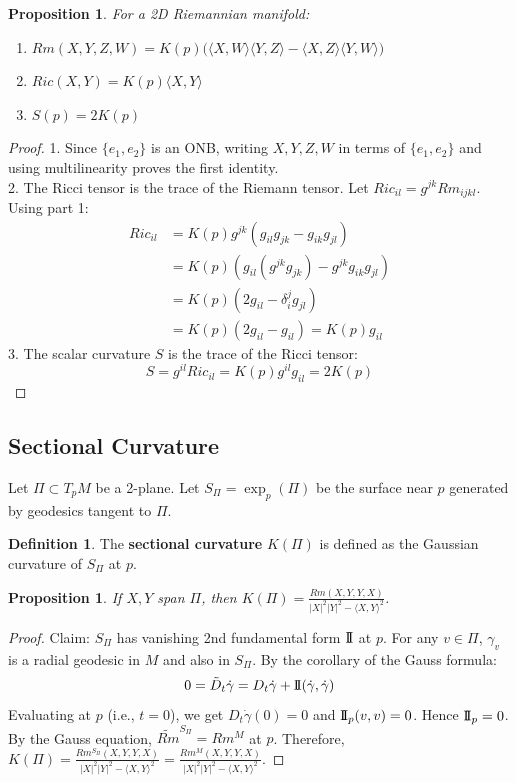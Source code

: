 \documentclass[11pt, a4paper]{article}
\theoremstyle{plain}
\newtheorem{proposition}[theorem]{Proposition}
\theoremstyle{definition}
\newtheorem{definition}[theorem]{Definition}
\theoremstyle{remark}
\begin{document}
{\begin{proposition}
For a 2D Riemannian manifold:
\begin{enumerate}
    \item $Rm(X,Y,Z,W) = K(p) \big( \langle X,W \rangle \langle Y,Z \rangle - \langle X,Z \rangle \langle Y,W \rangle \big)$
    \item $Ric(X,Y) = K(p) \langle X,Y \rangle$
    \item $S(p) = 2K(p)$
\end{enumerate}
\end{proposition}
\begin{proof}
1. Since $\{e_1, e_2\}$ is an ONB, writing $X,Y,Z,W$ in terms of $\{e_1, e_2\}$ and using multilinearity proves the first identity. \\
2. The Ricci tensor is the trace of the Riemann tensor. Let $Ric_{il} = g^{jk} Rm_{ijkl}$. Using part 1:
\begin{align*}
    Ric_{il} &= K(p) g^{jk} (g_{il} g_{jk} - g_{ik} g_{jl}) \\
    &= K(p) (g_{il} (g^{jk}g_{jk}) - g^{jk}g_{ik} g_{jl}) \\
    &= K(p) (2 g_{il} - \delta^j_i g_{jl}) \\
    &= K(p) (2 g_{il} - g_{il}) = K(p) g_{il}
\end{align*}
3. The scalar curvature $S$ is the trace of the Ricci tensor:
\[ S = g^{il} Ric_{il} = K(p) g^{il} g_{il} = 2K(p) \]
\end{proof}

\subsection*{Sectional Curvature}
Let $\Pi \subset T_pM$ be a 2-plane. Let $S_\Pi = \exp_p(\Pi)$ be the surface near $p$ generated by geodesics tangent to $\Pi$.
\begin{definition}
The \textbf{sectional curvature} $K(\Pi)$ is defined as the Gaussian curvature of $S_\Pi$ at $p$.
\end{definition}

\begin{proposition}
If $X, Y$ span $\Pi$, then $K(\Pi) = \frac{Rm(X,Y,Y,X)}{|X|^2|Y|^2 - \langle X,Y \rangle^2}$.
\end{proposition}
\begin{proof}
Claim: $S_\Pi$ has vanishing 2nd fundamental form $\mathrm{I\!I}$ at $p$.
For any $v \in \Pi$, $\gamma_v$ is a radial geodesic in $M$ and also in $S_\Pi$. By the corollary of the Gauss formula:
\[ 0 = \tilde{D}_t \dot{\gamma} = D_t \dot{\gamma} + \mathrm{I\!I}(\dot{\gamma}, \dot{\gamma}) \]
Evaluating at $p$ (i.e., $t=0$), we get $D_t \dot{\gamma}(0) = 0$ and $\mathrm{I\!I}_p(v,v) = 0$. Hence $\mathrm{I\!I}_p = 0$.
By the Gauss equation, $\tilde{Rm}^{S_\Pi} = Rm^M$ at $p$.
Therefore, $K(\Pi) = \frac{Rm^{S_\Pi}(X,Y,Y,X)}{|X|^2|Y|^2 - \langle X,Y \rangle^2} = \frac{Rm^M(X,Y,Y,X)}{|X|^2|Y|^2 - \langle X,Y \rangle^2}$.
\end{proof}

}
\end{document}
